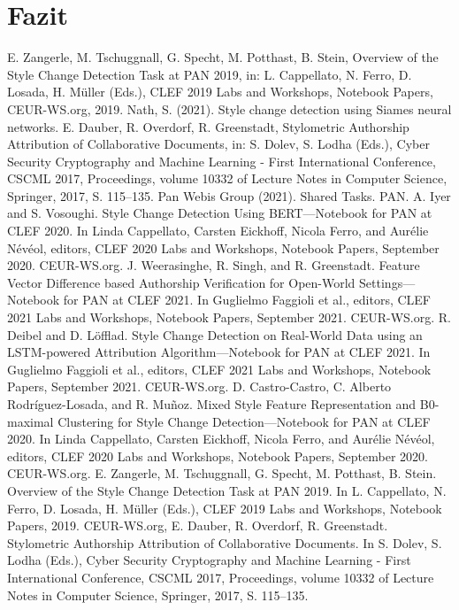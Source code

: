 \documentclass[conference]{IEEEtran}
\begin{document}
\section{Fazit}


\begin{thebibliography}{00}
 E. Zangerle, M. Tschuggnall, G. Specht, M. Potthast, B. Stein, Overview of the Style Change Detection Task at PAN 2019, in: L. Cappellato, N. Ferro, D. Losada, H. Müller (Eds.), CLEF 2019 Labs and Workshops, Notebook Papers, CEUR-WS.org, 2019.
 Nath, S. (2021).  Style change detection using Siames neural networks.
 E. Dauber, R. Overdorf, R. Greenstadt, Stylometric Authorship Attribution of Collaborative Documents, in: S. Dolev, S. Lodha (Eds.), Cyber Security Cryptography and Machine Learning - First International Conference, CSCML 2017, Proceedings, volume 10332 of Lecture Notes in Computer Science, Springer, 2017, S. 115–135.
 Pan Webis Group (2021). Shared Tasks. PAN.
 A. Iyer and S. Vosoughi. Style Change Detection Using BERT—Notebook for PAN at CLEF 2020. In Linda Cappellato, Carsten Eickhoff, Nicola Ferro, and Aurélie Névéol, editors, CLEF 2020 Labs and Workshops, Notebook Papers, September 2020. CEUR-WS.org.
 J. Weerasinghe, R. Singh, and R. Greenstadt. Feature Vector Difference based Authorship Verification for Open-World Settings—Notebook for PAN at CLEF 2021. In Guglielmo Faggioli et al., editors, CLEF 2021 Labs and Workshops, Notebook Papers, September 2021. CEUR-WS.org.
 R. Deibel and D. Löfflad. Style Change Detection on Real-World Data using an LSTM-powered Attribution Algorithm—Notebook for PAN at CLEF 2021. In Guglielmo Faggioli et al., editors, CLEF 2021 Labs and Workshops, Notebook Papers, September 2021. CEUR-WS.org.
 D. Castro-Castro, C. Alberto Rodríguez-Losada, and R. Muñoz. Mixed Style Feature Representation and B0-maximal Clustering for Style Change Detection—Notebook for PAN at CLEF 2020. In Linda Cappellato, Carsten Eickhoff, Nicola Ferro, and Aurélie Névéol, editors, CLEF 2020 Labs and Workshops, Notebook Papers, September 2020. CEUR-WS.org.
 E. Zangerle, M. Tschuggnall, G. Specht, M. Potthast, B. Stein. Overview of the Style Change Detection Task at PAN 2019. In L. Cappellato, N. Ferro, D. Losada, H. Müller (Eds.), CLEF 2019 Labs and Workshops, Notebook Papers, 2019. CEUR-WS.org,
 E. Dauber, R. Overdorf, R. Greenstadt. Stylometric Authorship Attribution of Collaborative Documents. In S. Dolev, S. Lodha (Eds.), Cyber Security Cryptography and Machine Learning - First International Conference, CSCML 2017, Proceedings, volume 10332 of Lecture Notes in Computer Science, Springer, 2017, S. 115–135.

\end{thebibliography}
\end{document}
